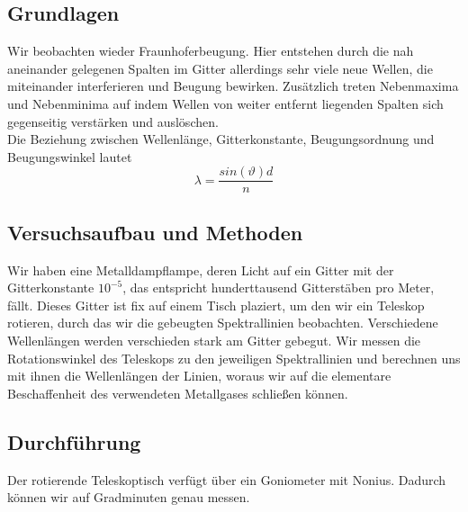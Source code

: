 \documentclass{article}
\begin{document}
\subsection{Grundlagen}
Wir beobachten wieder Fraunhoferbeugung. Hier entstehen durch die nah aneinander gelegenen Spalten im Gitter allerdings sehr viele neue Wellen, die miteinander interferieren und Beugung bewirken. Zusätzlich treten Nebenmaxima und Nebenminima auf indem Wellen von weiter entfernt liegenden Spalten sich gegenseitig verstärken und auslöschen. \\
Die Beziehung zwischen Wellenlänge, Gitterkonstante, Beugungsordnung und Beugungswinkel lautet \\
\begin{equation}
\label{gitter}
\lambda=\frac{sin(\vartheta)d}{n}
\end{equation}
\subsection{Versuchsaufbau und Methoden}
Wir haben eine Metalldampflampe, deren Licht auf ein Gitter mit der Gitterkonstante $10^{-5}$, das entspricht hunderttausend Gitterstäben pro Meter, fällt. Dieses Gitter ist fix auf einem Tisch plaziert, um den wir ein Teleskop rotieren, durch das wir die gebeugten Spektrallinien beobachten. Verschiedene Wellenlängen werden verschieden stark am Gitter gebegut. Wir messen die Rotationswinkel des Teleskops zu den jeweiligen Spektrallinien und berechnen uns mit ihnen die Wellenlängen der Linien, woraus wir auf die elementare Beschaffenheit des verwendeten Metallgases schließen können.
\subsection{Durchführung}

Der rotierende Teleskoptisch verfügt über ein Goniometer mit Nonius. Dadurch können wir auf Gradminuten genau messen.
\end{document}

